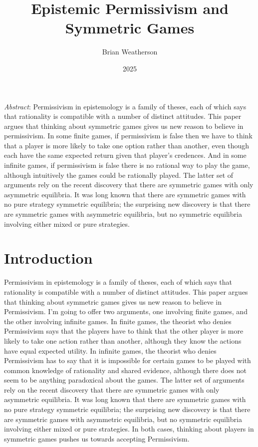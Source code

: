 \documentclass[
  11pt,
  letterpaper,
  DIV=11,
  numbers=noendperiod,
  twoside]{scrartcl}
\title{Epistemic Permissivism and Symmetric Games}
\author{Brian Weatherson}
\date{2025}
\renewenvironment{abstract}
 {\vspace{-1.25cm}
 \quotation\small\noindent\emph{Abstract}:}
 {\endquotation}
\renewenvironment{abstract}
 {\quotation\small\noindent\emph{Abstract}:}
 {\endquotation\vspace{-0.02cm}}
\begin{document}
\maketitle
\begin{abstract}
Permissivism in epistemology is a family of theses, each of which says
that rationality is compatible with a number of distinct attitudes. This
paper argues that thinking about symmetric games gives us new reason to
believe in permissivism. In some finite games, if permissivism is false
then we have to think that a player is more likely to take one option
rather than another, even though each have the same expected return
given that player's credences. And in some infinite games, if
permissivism is false there is no rational way to play the game,
although intuitively the games could be rationally played. The latter
set of arguments rely on the recent discovery that there are symmetric
games with only asymmetric equilibria. It was long known that there are
symmetric games with no pure strategy symmetric equilibria; the
surprising new discovery is that there are symmetric games with
asymmetric equilibria, but no symmetric equilibria involving either
mixed or pure strategies.
\end{abstract}


\section{Introduction}\label{introduction}

Permissivism in epistemology is a family of theses, each of which says
that rationality is compatible with a number of distinct attitudes. This
paper argues that thinking about symmetric games gives us new reason to
believe in Permissivism. I'm going to offer two arguments, one involving
finite games, and the other involving infinite games. In finite games,
the theorist who denies Permissivism says that the players have to think
that the other player is more likely to take one action rather than
another, although they know the actions have equal expected utility. In
infinite games, the theorist who denies Permissivism has to say that it
is impossible for certain games to be played with common knowledge of
rationality and shared evidence, although there does not seem to be
anything paradoxical about the games. The latter set of arguments rely
on the recent discovery that there are symmetric games with only
asymmetric equilibria. It was long known that there are symmetric games
with no pure strategy symmetric equilibria; the surprising new discovery
is that there are symmetric games with asymmetric equilibria, but no
symmetric equilibria involving either mixed or pure strategies. In both
cases, thinking about players in symmetric games pushes us towards
accepting Permissivism.
\end{document}
